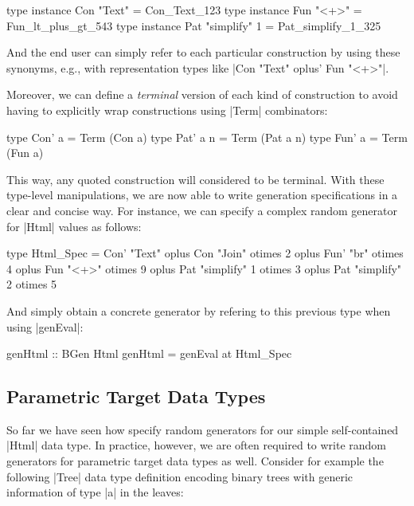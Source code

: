 \begin{code}
type instance Con "Text"        = Con_Text_123
type instance Fun "<+>"         = Fun_lt_plus_gt_543
type instance Pat "simplify" 1  = Pat_simplify_1_325
\end{code}

And the end user can simply refer to each particular construction by using these
synonyms, e.g., with representation types like |Con "Text" oplus' Fun "<+>"|.


Moreover, we can define a \emph{terminal} version of each kind of construction
to avoid having to explicitly wrap constructions using |Term| combinators:

\begin{code}
type Con' a    = Term  (Con a)
type Pat' a n  = Term  (Pat a n)
type Fun' a    = Term  (Fun a)
\end{code}

This way, any quoted construction will considered to be terminal.
%
With these type-level manipulations, we are now able to write generation
specifications in a clear and concise way.
%
For instance, we can specify a complex random generator for |Html| values as
follows:

\begin{code}
type Html_Spec
  =      Con'  "Text"
  oplus  Con   "Join"         otimes 2
  oplus  Fun'  "br"           otimes 4
  oplus  Fun   "<+>"          otimes 9
  oplus  Pat   "simplify"  1  otimes 3
  oplus  Pat   "simplify"  2  otimes 5
\end{code}

And simply obtain a concrete generator by refering to this previous type when
using |genEval|:

\begin{code}
genHtml :: BGen Html
genHtml = genEval at Html_Spec
\end{code}


%
\subsection{Parametric Target Data Types }

So far we have seen how specify random generators for our simple self-contained
|Html| data type.
%
In practice, however, we are often required to write random generators for
parametric target data types as well.
%
Consider for example the following |Tree| data type definition encoding binary
trees with generic information of type |a| in the leaves:


